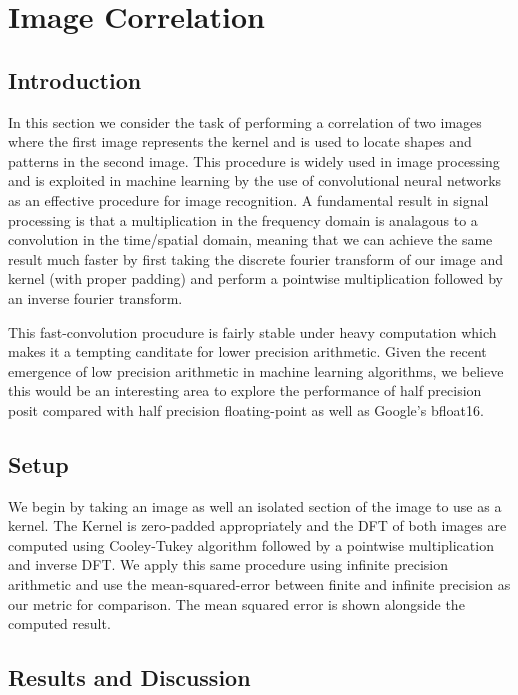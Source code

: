 \documentclass[conference]{IEEEtran}
\begin{document}
\section{Image Correlation}

\subsection{Introduction}
In this section we consider the task of performing a correlation of two images where the first image represents the kernel and is used to locate shapes and patterns in the second image. This procedure is widely used in image processing and is exploited in machine learning by the use of convolutional neural networks as an effective procedure for image recognition. A fundamental result in signal processing is that a multiplication in the frequency domain is analagous to a convolution in the time/spatial domain, meaning that we can achieve the same result much faster by first taking the discrete fourier transform of our image and kernel (with proper padding) and perform a pointwise multiplication followed by an inverse fourier transform. 

This fast-convolution procudure is fairly stable under heavy computation which makes it a tempting canditate for lower precision arithmetic. Given the recent emergence of low precision arithmetic in machine learning algorithms, we believe this would be an interesting area to explore the performance of half precision posit compared with half precision floating-point as well as Google's bfloat16. 


\subsection{Setup}

We begin by taking an image as well an isolated section of the image to use as a kernel. The Kernel is zero-padded appropriately and the DFT of both images are computed using Cooley-Tukey algorithm followed by a pointwise multiplication and inverse DFT. We apply this same procedure using infinite precision arithmetic and use the mean-squared-error between finite and infinite precision as our metric for comparison. The mean squared error is shown alongside the computed result. 

\subsection{Results and Discussion}
\end{document}
